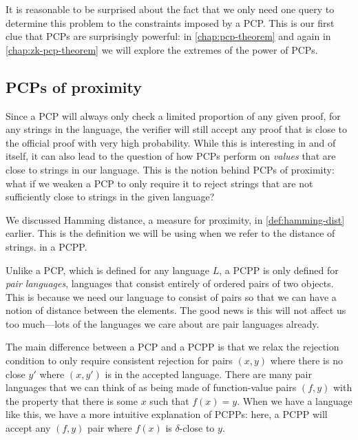 \documentclass[english,12pt]{reedthesis}
\theoremstyle{plain}
\theoremstyle{definition}
\theoremstyle{remark}
\begin{document}
It is reasonable to be surprised about the fact that we only need one query to
determine this problem to the constraints imposed by a PCP\@. This is our first
clue that PCPs are surprisingly powerful: in \cref{chap:pcp-theorem} and again
in \cref{chap:zk-pcp-theorem} we will explore the extremes of the power of PCPs.

\subsection{PCPs of proximity}\label{sec:pcpp}

Since a PCP will always only check a limited proportion of any given proof, for
any strings in the language, the verifier will still accept any proof that is
close to the official proof with very high probability. While this is
interesting in and of itself, it can also lead to the question of how PCPs
perform on \emph{values} that are close to strings in our language. This is the
notion behind PCPs of proximity: what if we weaken a PCP to only require it to
reject strings that are not sufficiently close to strings in the given language?

We discussed Hamming distance, a measure for proximity, in
\cref{def:hamming-dist} earlier. This is the definition we will be using when we
refer to the distance of strings. in a PCPP.

Unlike a PCP, which is defined for any language $L$, a PCPP is only defined for
\emph{pair languages}, languages that consist entirely of
ordered pairs of two objects. This is because we need our language to consist of
pairs so that we can have a notion of distance between the elements. The good
news is this will not affect us too much---lots of the languages we care about are
pair languages already.

The main difference between a PCP and a PCPP is that we relax the rejection
condition to only require consistent rejection for pairs $(x, y)$ where there is
no close $y'$ where $(x, y')$ is in the accepted language. There are many pair
languages that we can think of as being made of function-value pairs $(f, y)$
with the property that there is some $x$ such that $f(x) = y$. When we have a
language like this, we have a more intuitive explanation of PCPPs: here, a PCPP
will accept any $(f, y)$ pair where $f(x)$ is $\delta$-close to $y$.
\end{document}
